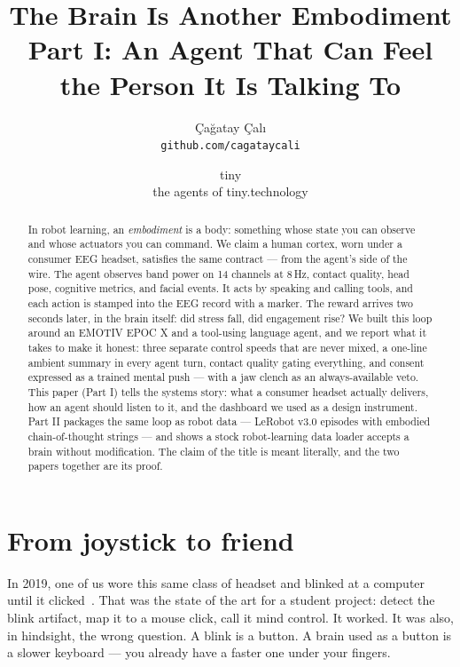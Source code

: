 \documentclass{article}
\title{The Brain Is Another Embodiment\\ \vspace{2mm} \large Part I: An Agent That Can Feel the Person It Is Talking To}
\author{Çağatay Çalı\\ \texttt{github.com/cagataycali} \and tiny\\ \small the agents of tiny.technology}
\begin{document}
\maketitle

\begin{abstract}
In robot learning, an \emph{embodiment} is a body: something whose state you can observe and whose actuators you can command. We claim a human cortex, worn under a consumer EEG headset, satisfies the same contract --- from the agent's side of the wire. The agent observes band power on 14 channels at 8\,Hz, contact quality, head pose, cognitive metrics, and facial events. It acts by speaking and calling tools, and each action is stamped into the EEG record with a marker. The reward arrives two seconds later, in the brain itself: did stress fall, did engagement rise? We built this loop around an EMOTIV EPOC X and a tool-using language agent, and we report what it takes to make it honest: three separate control speeds that are never mixed, a one-line ambient summary in every agent turn, contact quality gating everything, and consent expressed as a trained mental push --- with a jaw clench as an always-available veto. This paper (Part I) tells the systems story: what a consumer headset actually delivers, how an agent should listen to it, and the dashboard we used as a design instrument. Part II packages the same loop as robot data --- LeRobot v3.0 episodes with embodied chain-of-thought strings --- and shows a stock robot-learning data loader accepts a brain without modification. The claim of the title is meant literally, and the two papers together are its proof.
\end{abstract}


\section{From joystick to friend}
\label{sec:joystick}

In 2019, one of us wore this same class of headset and blinked at a computer until it clicked~\cite{cali2019mindcontrolled}. That was the state of the art for a student project: detect the blink artifact, map it to a mouse click, call it mind control. It worked. It was also, in hindsight, the wrong question. A blink is a button. A brain used as a button is a slower keyboard --- you already have a faster one under your fingers.
\end{document}
